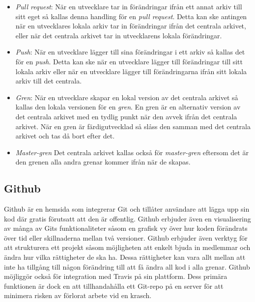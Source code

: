 \begin{itemize}
	\item \textit{Pull request}: När en utvecklare tar in förändringar ifrån ett annat arkiv till sitt eget så kallas denna handling för en \textit{pull request}. Detta kan ske antingen när en utvecklares lokala arkiv tar in förändringar ifrån det centrala arkivet, eller när det centrala arkivet tar in utvecklarens lokala förändringar.
	
	\item \textit{Push}: När en utvecklare lägger till sina förändringar i ett arkiv så kallas det för en \textit{push}. Detta kan ske när en utvecklare lägger till förändringar till sitt lokala arkiv eller när en utvecklare lägger till förändringarna ifrån sitt lokala arkiv till det centrala.
	
	\item \textit{Gren}: När en utvecklare skapar en lokal version av det centrala arkivet så kallas den lokala versionen för en \textit{gren}. En gren är en alternativ version av det centrala arkivet med en tydlig punkt när den avvek ifrån det centrala arkivet. När en gren är färdigutvecklad så slåss den samman med det centrala arkivet och tas då bort efter det.
	
	\item \textit{Master-gren} Det centrala arkivet kallas också för \textit{master-gren} eftersom det är den grenen alla andra grenar kommer ifrån när de skapas.
\end{itemize}


\subsection*{Github}
Github är en hemsida som integrerar Git och tillåter användare att lägga upp sin kod där gratis förutsatt att den är offentlig.\cite{Github} Github erbjuder även en visualisering av många av Gits funktionaliteter såsom en grafisk vy över hur koden förändrats över tid eller skillnaderna mellan två versioner. Github erbjuder även verktyg för att strukturera ett projekt såsom möjligheten att enkelt bjuda in medlemmar och ändra hur vilka rättigheter de ska ha. Dessa rättigheter kan vara allt mellan att inte ha tillgång till någon förändring till att få ändra all kod i alla grenar. Github möjliggör också för integration med Travis på sin plattform. Dess primära funktionen är dock en att tillhandahålla ett Git-repo på en server för att minimera risken av förlorat arbete vid en krasch.

